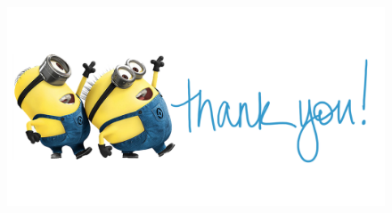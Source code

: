 \documentclass{beamer}
\begin{document}
\begin{frame}
\begin{figure}
\begin{center}
\includegraphics[scale=0.7]{thankyou.png}
\end{center}
\end{figure}
\end{frame}






\end{document}
